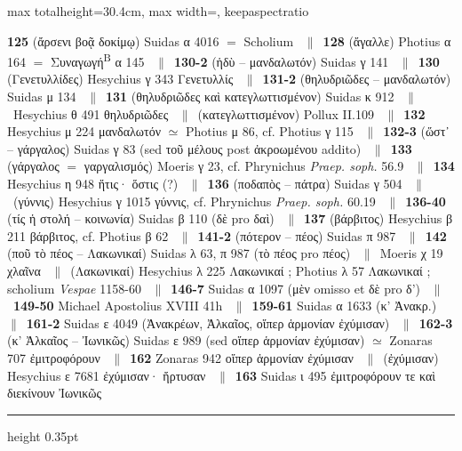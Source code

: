 \documentclass[11pt,twoside]{book}
\newcommand{\italique}[1]{\textit{#1}}
\newcommand{\expo}[1]{\textsuperscript{#1}}
\newcommand{\SynB}{Συναγωγή\expo{B} }
\newcommand{\Apostol}{Michael Apostolius }
\newcommand{\Phryn}{Phrynichus \textit{Praep. soph.} }
\newcommand{\espTest}{\ {\color{ruleGold}$\parallel$}\ }
\begin{document}
\begin{adjustbox}{max totalheight=30.4cm, max width=\textwidth, keepaspectratio}
\begin{minipage}{\textwidth}
{ \textbf{125} (ἄρσενι βοᾷ δοκίμῳ) Suidas α 4016 $=$ Scholium \espTest \textbf{128} (ἄγαλλε) Photius α 164 $=$ \SynB α 145 \espTest \textbf{130-2} (ἡδὺ -- μανδαλωτόν) Suidas γ 141 \espTest \textbf{130} (Γενετυλλίδες) Hesychius γ 343 Γενετυλλίς \espTest \textbf{131-2} (θηλυδριῶδες -- μανδαλωτόν) Suidas μ 134 \espTest \textbf{131} (θηλυδριῶδες καὶ κατεγλωττισμένον) Suidas κ 912 \espTest Hesychius θ 491 θηλυδριῶδες \espTest (κατεγλωττισμένον) Pollux II.109 \espTest \textbf{132} Hesychius μ 224 μανδαλωτόν $\simeq$ Photius μ 86, cf. Photius γ 115 \espTest \textbf{132-3} (ὥστ᾽ -- γάργαλος) Suidas γ 83 (sed τοῦ μέλους post ἀκροωμένου addito) \espTest \textbf{133} (γάργαλος $=$ γαργαλισμός) Moeris γ 23, cf. \Phryn 56.9 \espTest \textbf{134} Hesychius η 948 ἥτις· ὅστις (?) \espTest \textbf{136} (ποδαπὸς -- πάτρα) Suidas γ 504 \espTest (γύννις) Hesychius γ 1015 γύννις, cf. \Phryn 60.19 \espTest \textbf{136-40} (τίς ἡ στολή -- κοινωνία) Suidas β 110 (δὲ pro δαὶ) \espTest \textbf{137} (βάρβιτος) Hesychius β 211 βάρβιτος, cf. Photius β 62 \espTest \textbf{141-2} (πότερον -- πέος) Suidas π 987 \espTest \textbf{142} (ποῦ τὸ πέος -- Λακωνικαί) Suidas λ 63, π 987 (τὸ πέος pro πέος) \espTest Moeris χ 19 χλαῖνα \espTest (Λακωνικαί) Hesychius λ 225 Λακωνικαί ; Photius λ 57 Λακωνικαί ; scholium \italique{Vespae} 1158-60 \espTest \textbf{146-7} Suidas α 1097 (μὲν omisso et δὲ pro δ') \espTest \textbf{149-50} \Apostol XVIII 41h \espTest \textbf{159-61} Suidas α 1633 (κ' Ἀνακρ.) \espTest \textbf{161-2} Suidas ε 4049 (Ἀνακρέων, Ἀλκαῖος, οἵπερ ἁρμονίαν ἐχύμισαν) \espTest \textbf{162-3} (κ' Ἀλκαῖος -- Ἰωνικῶς) Suidas ε 989 (sed οἵπερ ἁρμονίαν ἐχύμισαν) $\simeq$ Zonaras 707 ἐμιτροφόρουν \espTest \textbf{162} Zonaras 942 οἵπερ ἁρμονίαν ἐχύμισαν \espTest (ἐχύμισαν) Hesychius ε 7681 ἐχύμισαν· ἤρτυσαν \espTest \textbf{163} Suidas ι 495 ἐμιτροφόρουν τε καὶ διεκίνουν Ἰωνικῶς\par\vspace{2.5pt}
{\color{ruleGold}\hrule height 0.35pt}\vspace{2.5pt}
}
\end{minipage}
\end{adjustbox}
\end{document}
